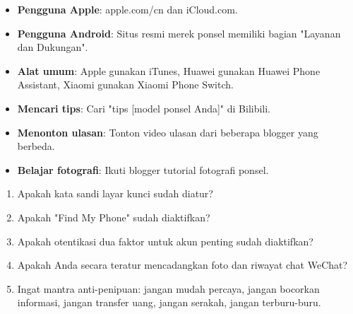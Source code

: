 

\begin{itemize}
  \item \textbf{Pengguna Apple}: apple.com/cn dan iCloud.com.
  \item \textbf{Pengguna Android}: Situs resmi merek ponsel memiliki bagian "Layanan dan Dukungan".
  \item \textbf{Alat umum}: Apple gunakan iTunes, Huawei gunakan Huawei Phone Assistant, Xiaomi gunakan Xiaomi Phone Switch.
\end{itemize}


\begin{itemize}
  \item \textbf{Mencari tips}: Cari "tips [model ponsel Anda]" di Bilibili.
  \item \textbf{Menonton ulasan}: Tonton video ulasan dari beberapa blogger yang berbeda.
  \item \textbf{Belajar fotografi}: Ikuti blogger tutorial fotografi ponsel.
\end{itemize}


\begin{enumerate}
  \item Apakah kata sandi layar kunci sudah diatur?
  \item Apakah "Find My Phone" sudah diaktifkan?
  \item Apakah otentikasi dua faktor untuk akun penting sudah diaktifkan?
  \item Apakah Anda secara teratur mencadangkan foto dan riwayat chat WeChat?
  \item Ingat mantra anti-penipuan: jangan mudah percaya, jangan bocorkan informasi, jangan transfer uang, jangan serakah, jangan terburu-buru.
\end{enumerate}
